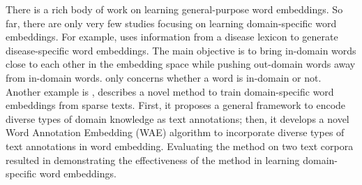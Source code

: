 There is a rich body of work on learning general-purpose word embeddings. So far, there are only very few studies focusing on learning domain-specific word embeddings. For example, \citeauthor{ghosh2016designing} \citeyear{ghosh2016designing} \cite{ghosh2016designing} uses information from a disease lexicon to generate disease-specific word embeddings. The main objective is to bring in-domain words close to each other in the embedding space while pushing out-domain words away from in-domain words. \citeauthor{ghosh2016designing} \citeyear{ghosh2016designing} \cite{ghosh2016designing} only concerns whether a word is in-domain or not.
Another example is \citeauthor{domainSpecificWordEmbedding} \citeyear{domainSpecificWordEmbedding} \cite{domainSpecificWordEmbedding}, describes a novel method to train domain-specific word embeddings from sparse texts. First, it proposes a general framework to encode diverse types of domain knowledge as text annotations; then, it develops a novel Word Annotation Embedding (WAE) algorithm to incorporate diverse types of text annotations in word embedding. Evaluating the method on two text corpora resulted in demonstrating the effectiveness of the method in learning domain-specific word embeddings.



